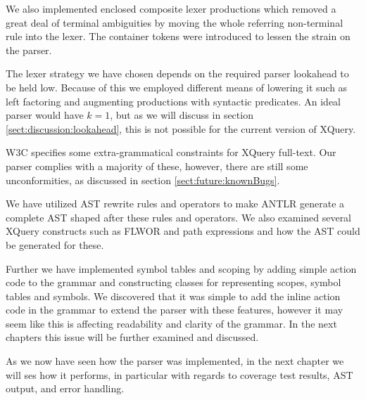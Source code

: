 We also implemented enclosed composite lexer productions which removed a great
deal of terminal ambiguities by moving the whole referring non-terminal rule
into the lexer. The container tokens were introduced to lessen the strain on
the parser.

The lexer strategy we have chosen depends on the required parser lookahead to
be held low. Because of this we employed different means of lowering it such as
left factoring and augmenting productions with syntactic predicates. An ideal
parser would have $k=1$, but as we will discuss in section
\ref{sect:discussion:lookahead}, this is not possible for the current version
of XQuery.

W3C specifies some extra-grammatical constraints for XQuery full-text. Our parser
complies with a majority of these, however, there are still some
unconformities, as discussed in section \ref{sect:future:knownBugs}.  

We have utilized AST rewrite rules and operators to make
ANTLR generate a complete AST shaped after these rules and operators. We also
examined several XQuery constructs such as FLWOR and path expressions and how
the AST could be generated for these.

Further we have implemented symbol tables and scoping by adding simple action
code to the grammar and constructing classes for representing scopes, symbol
tables and symbols. We discovered that it was simple to add the inline action 
code in the grammar to extend the parser with these features, however it may
seem like this is affecting readability and clarity of the grammar. In the next
chapters this issue will be further examined and discussed.

As we now have seen how the parser was implemented, in the next chapter we will
ses how it performs, in particular with regards to coverage test results, AST
output, and error handling.